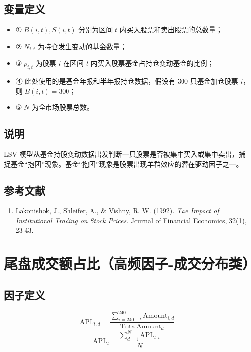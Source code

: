\documentclass{article}
\begin{document}
\subsection{变量定义}
\begin{itemize}
    \item ① \( B(i,t), S(i,t) \) 分别为区间 \( t \) 内买入股票和卖出股票的总数量；
    \item ② \( N_{i,t} \) 为持仓发生变动的基金数量；
    \item ③ \( p_{i,t} \) 为股票 \( i \) 在区间 \( t \) 内买入股票基金占持仓变动基金的比例；
    \item ④ 此处使用的是基金年报和半年报持仓数据，假设有 300 只基金加仓股票 \( i \)，则 \( B(i,t) = 300 \)；
    \item ⑤ \( N \) 为全市场股票总数。
\end{itemize}

\subsection{说明}
LSV 模型从基金持股变动数据出发判断一只股票是否被集中买入或集中卖出，捕捉基金“抱团”现象。基金“抱团”现象是股票出现羊群效应的潜在驱动因子之一。

\subsection{参考文献}
\begin{enumerate}
    \item Lakonishok, J., Shleifer, A., \& Vishny, R. W. (1992). \textit{The Impact of Institutional Trading on Stock Prices}. Journal of Financial Economics, 32(1), 23-43.
\end{enumerate}

\section{尾盘成交额占比（高频因子-成交分布类）}

\subsection{因子定义}
\begin{equation}
    \mathrm{APL}_{t,d} = \frac{\sum_{i=240-t}^{240} \mathrm{Amount}_{i,d}}{\mathrm{TotalAmount}_d}
\end{equation}
\begin{equation}
    \mathrm{APL}_t = \frac{\sum_{d=1}^{N} \mathrm{APL}_{t,d}}{N}
\end{equation}
\end{document}
